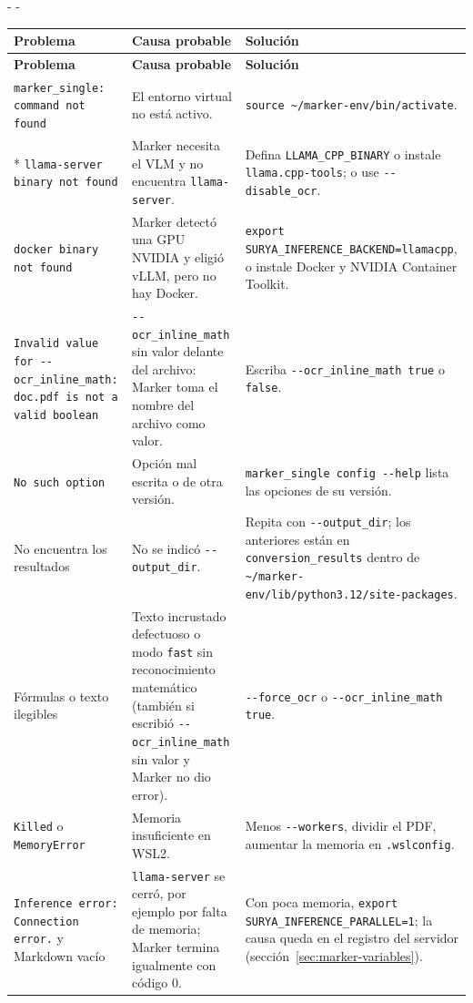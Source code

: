 \documentclass[11pt,a4paper]{article}
\makeatletter
\newcommand{\necesitaespacio}[1]{\par\penalty-100\begingroup
	\setlength{\dimen@}{#1}\dimen@ii\pagegoal\advance\dimen@ii-\pagetotal
	\ifdim\dimen@>\dimen@ii\ifdim\dimen@ii>\z@\vfil\fi\penalty-\@M\fi\endgroup}
\newenvironment{errores}{%
	\par\begingroup\small
	\begin{longtable}{L{4.1cm}L{4.9cm}L{6.0cm}}
		\toprule\rowcolor{tablacab}\cab{Problema} & \cab{Causa probable} & \cab{Solución} \\ \midrule
		\endfirsthead
		\toprule\rowcolor{tablacab}\cab{Problema} & \cab{Causa probable} & \cab{Solución} \\ \midrule
		\endhead
		\bottomrule
		\endfoot}
	{\end{longtable}\endgroup}
\newcommand{\cmd}[1]{\texttt{\textcolor{colcmd}{#1}}}      %
\newcommand{\opt}[1]{\texttt{\textcolor{colopt}{#1}}}      %
\newcommand{\arch}[1]{\texttt{\textcolor{colarch}{#1}}}    %
\newcommand{\val}[1]{\texttt{#1}}                          %
\newcommand{\cab}[1]{\textbf{#1}}
\newcommand{\tl}{\textasciitilde{}}  %
\makeatother
\begin{document}
	\necesitaespacio{10\baselineskip}
	\begin{errores}
		\texttt{marker\_\allowbreak{}single: command not found} & El entorno virtual no está activo. & \cmd{source \tl/\allowbreak{}marker-\allowbreak{}env/\allowbreak{}bin/\allowbreak{}activate}.\\*
		\texttt{llama-\allowbreak{}server binary not found} & Marker necesita el VLM y no encuentra \cmd{llama-server}. & Defina \texttt{LLAMA\_\allowbreak{}CPP\_\allowbreak{}BINARY} o instale \texttt{llama.cpp-\allowbreak{}tools}; o use \opt{-{}-disable\_ocr}.\\
		\texttt{docker binary not found} & Marker detectó una GPU NVIDIA y eligió vLLM, pero no hay Docker. & \texttt{export SURYA\_\allowbreak{}INFERENCE\_\allowbreak{}BACKEND=\allowbreak{}llamacpp}, o instale Docker y NVIDIA Container Toolkit.\\
		\texttt{Invalid value for \textquotesingle{}-{}-ocr\_\allowbreak{}inline\_\allowbreak{}math\textquotesingle{}: \textquotesingle{}doc.pdf\textquotesingle{} is not a valid boolean} & \opt{-{}-ocr\_\allowbreak{}inline\_\allowbreak{}math} sin valor delante del archivo: Marker toma el nombre del archivo como valor. & Escriba \opt{-{}-ocr\_\allowbreak{}inline\_\allowbreak{}math true} o \val{false}.\\
		\texttt{No such option} & Opción mal escrita o de otra versión. & \cmd{marker\_\allowbreak{}single config -{}-help} lista las opciones de su versión.\\
		No encuentra los resultados & No se indicó \opt{-{}-output\_dir}. & Repita con \opt{-{}-output\_dir}; los anteriores están en \arch{conversion\_\allowbreak{}results} dentro de \arch{\tl/\allowbreak{}marker-\allowbreak{}env/\allowbreak{}lib/\allowbreak{}python3.12/\allowbreak{}site-\allowbreak{}packages}.\\
		Fórmulas o texto ilegibles & Texto incrustado defectuoso o modo \val{fast} sin reconocimiento matemático (también si escribió \opt{-{}-ocr\_\allowbreak{}inline\_\allowbreak{}math} sin valor y Marker no dio error). & \opt{-{}-force\_ocr} o \opt{-{}-ocr\_\allowbreak{}inline\_\allowbreak{}math true}.\\
		\texttt{Killed} o \texttt{MemoryError} & Memoria insuficiente en WSL2. & Menos \opt{-{}-workers}, dividir el PDF, aumentar la memoria en \arch{.wslconfig}.\\
		\texttt{Inference error: Connection error.} y Markdown vacío & \cmd{llama-server} se cerró, por ejemplo por falta de memoria; Marker termina igualmente con código 0. & Con poca memoria, \texttt{export SURYA\_\allowbreak{}INFERENCE\_\allowbreak{}PARALLEL=\allowbreak{}1}; la causa queda en el registro del servidor (sección~\ref{sec:marker-variables}).\\

\end{errores}
\end{document}
